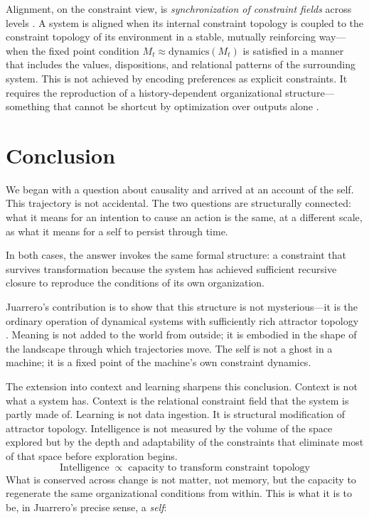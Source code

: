 \documentclass[11pt]{article}
\begin{document}
Alignment, on the constraint view, is \emph{synchronization of constraint fields} across
levels \citep{ashby1956}. A system is aligned when its internal constraint topology is
coupled to the constraint topology of its environment in a stable, mutually reinforcing
way—when the fixed point condition $M_t \approx \mathrm{dynamics}(M_t)$ is satisfied in
a manner that includes the values, dispositions, and relational patterns of the
surrounding system. This is not achieved by encoding preferences as explicit constraints.
It requires the reproduction of a history-dependent organizational structure—something
that cannot be shortcut by optimization over outputs alone \citep{varela1991,clark2008}.

\section{Conclusion}

We began with a question about causality and arrived at an account of the self. This
trajectory is not accidental. The two questions are structurally connected: what it means
for an intention to cause an action is the same, at a different scale, as what it means
for a self to persist through time.

In both cases, the answer invokes the same formal structure: a constraint that survives
transformation because the system has achieved sufficient recursive closure to reproduce
the conditions of its own organization.

Juarrero's contribution is to show that this structure is not mysterious—it is the
ordinary operation of dynamical systems with sufficiently rich attractor topology
\citep{prigogine1984,haken1983,kauffman2000}. Meaning is not added to the world from
outside; it is embodied in the shape of the landscape through which trajectories move.
The self is not a ghost in a machine; it is a fixed point of the machine's own constraint
dynamics.

The extension into context and learning sharpens this conclusion. Context is not what a
system has. Context is the relational constraint field that the system is partly made of.
Learning is not data ingestion. It is structural modification of attractor topology.
Intelligence is not measured by the volume of the space explored but by the depth and
adaptability of the constraints that eliminate most of that space before exploration begins.
\[
\mathrm{Intelligence} \;\propto\; \text{capacity to transform constraint topology}
\]
What is conserved across change is not matter, not memory, but the capacity to regenerate
the same organizational conditions from within. This is what it is to be, in Juarrero's
precise sense, a \emph{self}:
\end{document}

